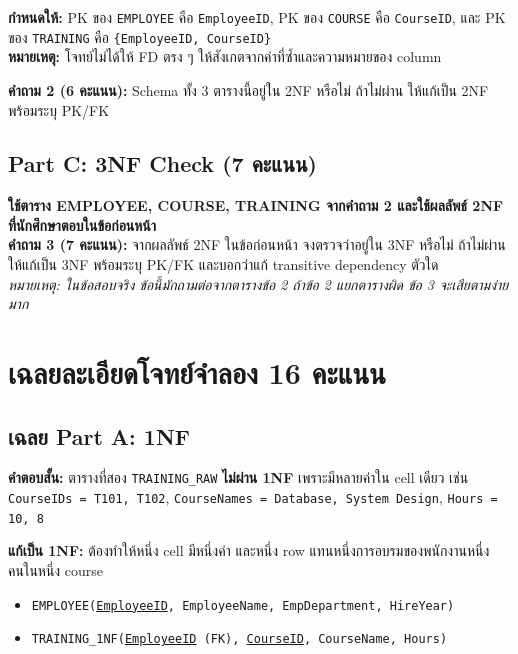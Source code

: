 \documentclass[a4paper,12pt]{article}
\newcommand{\pk}[1]{\uline{#1}}
\newcommand{\schema}[1]{\texttt{#1}}
\begin{document}
\noindent\textbf{กำหนดให้:} PK ของ \schema{EMPLOYEE} คือ \schema{EmployeeID}, PK ของ \schema{COURSE} คือ \schema{CourseID}, และ PK ของ \schema{TRAINING} คือ \schema{\{EmployeeID, CourseID\}}\\
\textbf{หมายเหตุ:} โจทย์ไม่ได้ให้ FD ตรง ๆ ให้สังเกตจากค่าที่ซ้ำและความหมายของ column

\noindent\textbf{คำถาม 2 (6 คะแนน):} Schema ทั้ง 3 ตารางนี้อยู่ใน 2NF หรือไม่ ถ้าไม่ผ่าน ให้แก้เป็น 2NF พร้อมระบุ PK/FK

\vspace{4.0cm}

\newpage
\subsection*{Part C: 3NF Check (7 คะแนน)}
\noindent\textbf{ใช้ตาราง EMPLOYEE, COURSE, TRAINING จากคำถาม 2 และใช้ผลลัพธ์ 2NF ที่นักศึกษาตอบในข้อก่อนหน้า}\\
\textbf{คำถาม 3 (7 คะแนน):} จากผลลัพธ์ 2NF ในข้อก่อนหน้า จงตรวจว่าอยู่ใน 3NF หรือไม่ ถ้าไม่ผ่าน ให้แก้เป็น 3NF พร้อมระบุ PK/FK และบอกว่าแก้ transitive dependency ตัวใด\\
\textit{หมายเหตุ: ในข้อสอบจริง ข้อนี้มักถามต่อจากตารางข้อ 2 ถ้าข้อ 2 แยกตารางผิด ข้อ 3 จะเสียตามง่ายมาก}

\vspace{5.5cm}

\newpage
\section*{เฉลยละเอียดโจทย์จำลอง 16 คะแนน}

\subsection*{เฉลย Part A: 1NF}
\textbf{คำตอบสั้น:} ตารางที่สอง \schema{TRAINING\_RAW} \textbf{ไม่ผ่าน 1NF} เพราะมีหลายค่าใน cell เดียว เช่น \schema{CourseIDs = T101, T102}, \schema{CourseNames = Database, System Design}, \schema{Hours = 10, 8}

\textbf{แก้เป็น 1NF:} ต้องทำให้หนึ่ง cell มีหนึ่งค่า และหนึ่ง row แทนหนึ่งการอบรมของพนักงานหนึ่งคนในหนึ่ง course

\begin{itemize}
    \item \schema{EMPLOYEE(\pk{EmployeeID}, EmployeeName, EmpDepartment, HireYear)}
    \item \schema{TRAINING\_1NF(\pk{EmployeeID} (FK), \pk{CourseID}, CourseName, Hours)}
\end{itemize}
\end{document}

